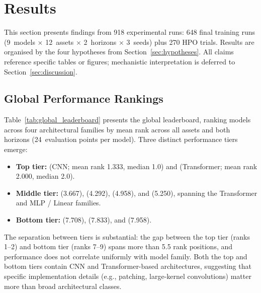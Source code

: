 \section{Results}
\label{sec:results}

This section presents findings from 918 experimental runs: 648 final training runs (9~models $\times$ 12~assets $\times$ 2~horizons $\times$ 3~seeds) plus 270 HPO trials.  Results are organised by the four hypotheses from Section~\ref{sec:hypotheses}.  All claims reference specific tables or figures; mechanistic interpretation is deferred to Section~\ref{sec:discussion}.

\subsection{Global Performance Rankings}
\label{sec:global_rankings}

Table~\ref{tab:global_leaderboard} presents the global leaderboard, ranking \nmodels models across four architectural families by mean \rmse rank across all \nassets assets and both horizons (24~evaluation points per model).  Three distinct performance tiers emerge:

\begin{itemize}[nosep]
  \item \textbf{Top tier:} \moderntcn (CNN; mean rank 1.333, median 1.0) and \patchtst (Transformer; mean rank 2.000, median 2.0).
  \item \textbf{Middle tier:} \itransformer (3.667), \timexer (4.292), \dlinear (4.958), and \nhits (5.250), spanning the Transformer and MLP / Linear families.
  \item \textbf{Bottom tier:} \timesnet (7.708), \autoformer (7.833), and \lstm (7.958).
\end{itemize}

The separation between tiers is substantial: the gap between the top tier (ranks 1--2) and bottom tier (ranks 7--9) spans more than 5.5 rank positions, and performance does not correlate uniformly with model family. Both the top and bottom tiers contain CNN and Transformer-based architectures, suggesting that specific implementation details (e.g., patching, large-kernel convolutions) matter more than broad architectural classes.


